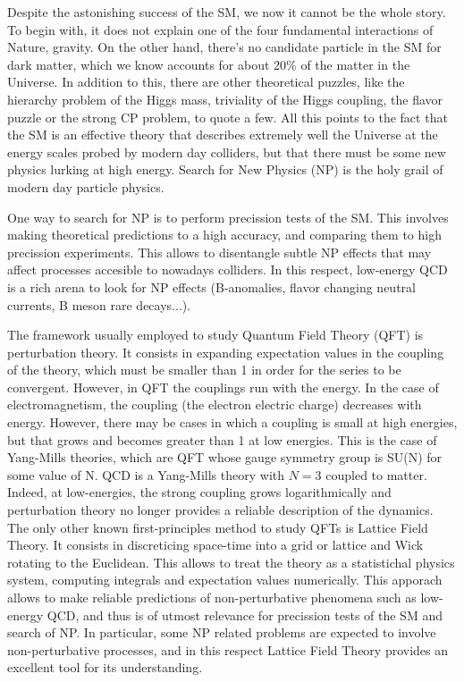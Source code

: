 Despite the astonishing success of the SM, we now it cannot be the whole story. To begin with, it does not explain one of the four fundamental interactions of Nature, gravity. On the other hand, there's no candidate particle in the SM for dark matter, which we know accounts for about 20\% of the matter in the Universe. In addition to this, there are other theoretical puzzles, like the hierarchy problem of the Higgs mass, triviality of the Higgs coupling, the flavor puzzle or the strong CP problem, to quote a few. All this points to the fact that the SM is an effective theory that describes extremely well the Universe at the energy scales probed by modern day colliders, but that there must be some new physics lurking at high energy. Search for New Physics (NP) is the holy grail of modern day particle physics. 

One way to search for NP is to perform precission tests of the SM. This involves making theoretical predictions to a high accuracy, and comparing them to high precission experiments. This allows to disentangle subtle NP effects that may affect processes accesible to nowadays colliders. In this respect, low-energy QCD is a rich arena to look for NP effects (B-anomalies, flavor changing neutral currents, B meson rare decays...).

The framework usually employed to study Quantum Field Theory (QFT) is perturbation theory. It consists in expanding expectation values in the coupling of the theory, which must be smaller than 1 in order for the series to be convergent. However, in QFT the couplings run with the energy. In the case of electromagnetism, the coupling (the electron electric charge) decreases with energy. However, there may be cases in which a coupling is small at high energies, but that grows and becomes greater than 1 at low energies. This is the case of Yang-Mills theories, which are QFT whose gauge symmetry group is SU(N) for some value of N. QCD is a Yang-Mills theory with $N=3$ coupled to matter. Indeed, at low-energies, the strong coupling grows logarithmically and perturbation theory no longer provides a reliable description of the dynamics. The only other known first-principles method to study QFTs is Lattice Field Theory. It consists in discreticing space-time into a grid or lattice and Wick rotating to the Euclidean. This allows to treat the theory as a statistichal physics system, computing integrals and expectation values numerically. This apporach allows to make reliable predictions of non-perturbative phenomena such as low-energy QCD, and thus is of utmost relevance for precission tests of the SM and search of NP. In particular, some NP related problems are expected to involve non-perturbative processes, and in this respect Lattice Field Theory provides an excellent tool for its understanding. 

